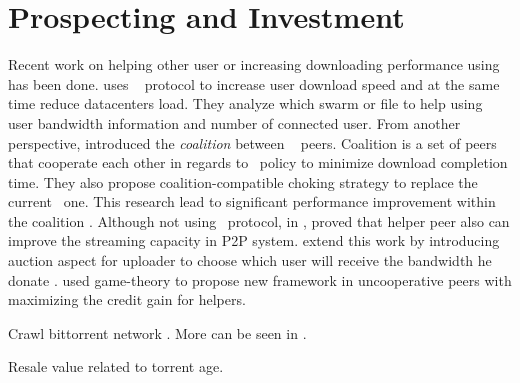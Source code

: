 \section{Prospecting and Investment}
Recent work on helping other user or increasing downloading performance using \bt~ has been done. \citeauthor{2014:cloudseed:leon} uses \bt~ protocol to increase user download speed and at the same time reduce datacenters load. They analyze which swarm or file to help using user bandwidth information and number of connected user\cite{2014:cloudseed:leon}. From another perspective, \citeauthor{2015:coalitionbt:zhang} introduced the \textit{coalition} between \bt~ peers. Coalition is a set of peers that cooperate each other in regards to \bt~policy to minimize download completion time. They also propose coalition-compatible choking strategy to replace the current \bt~one. This research lead to significant performance improvement within the coalition \cite{2015:coalitionbt:zhang}. Although not using \bt~protocol, in \citeyear{2009:p2phelp:he}, \citeauthor{2009:p2phelp:he} proved that helper peer also can improve the streaming capacity in P2P system\cite{2009:p2phelp:he}. \citeauthor{2016:gameauctionp2pstream:mostafavi} extend this work by introducing auction aspect for uploader to choose which user will receive the bandwidth he donate \cite{2016:gameauctionp2pstream:mostafavi}. \citeauthor{2016:gameauctionp2pstream:mostafavi} used game-theory to propose new framework in uncooperative peers with maximizing the credit gain for helpers.

Crawl bittorrent network \cite{2011:yoshida:crawlbtnet}. More can be seen in \cite{2010:btworld:wojciechowski}.

Resale value \cite{2012:economicbt:kash} related to torrent age. 